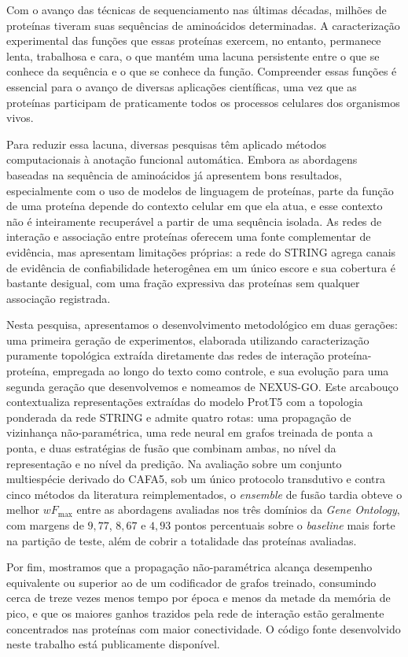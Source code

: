 \documentclass[Ingles]{ic-tese-v3}
\begin{document}
\begin{resumo}
Com o avanço das técnicas de sequenciamento nas últimas décadas, milhões de proteínas tiveram suas sequências de aminoácidos determinadas. A caracterização experimental das funções que essas proteínas exercem, no entanto, permanece lenta, trabalhosa e cara, o que mantém uma lacuna persistente entre o que se conhece da sequência e o que se conhece da função. Compreender essas funções é essencial para o avanço de diversas aplicações científicas, uma vez que as proteínas participam de praticamente todos os processos celulares dos organismos vivos.

Para reduzir essa lacuna, diversas pesquisas têm aplicado métodos computacionais à anotação funcional automática. Embora as abordagens baseadas na sequência de aminoácidos já apresentem bons resultados, especialmente com o uso de modelos de linguagem de proteínas, parte da função de uma proteína depende do contexto celular em que ela atua, e esse contexto não é inteiramente recuperável a partir de uma sequência isolada. As redes de interação e associação entre proteínas oferecem uma fonte complementar de evidência, mas apresentam limitações próprias: a rede do STRING agrega canais de evidência de confiabilidade heterogênea em um único escore e sua cobertura é bastante desigual, com uma fração expressiva das proteínas sem qualquer associação registrada.

Nesta pesquisa, apresentamos o desenvolvimento metodológico em duas gerações: uma primeira geração de experimentos, elaborada utilizando caracterização puramente topológica extraída diretamente das redes de interação proteína-proteína, empregada ao longo do texto como controle, e sua evolução para uma segunda geração que desenvolvemos e nomeamos de NEXUS-GO. Este arcabouço contextualiza representações extraídas do modelo ProtT5 com a topologia ponderada da rede STRING e admite quatro rotas: uma propagação de vizinhança não-paramétrica, uma rede neural em grafos treinada de ponta a ponta, e duas estratégias de fusão que combinam ambas, no nível da representação e no nível da predição. Na avaliação sobre um conjunto multiespécie derivado do CAFA5, sob um único protocolo transdutivo e contra cinco métodos da literatura reimplementados, o \emph{ensemble} de fusão tardia obteve o melhor $wF_{\max}$ entre as abordagens avaliadas nos três domínios da \emph{Gene Ontology}, com margens de $9{,}77$, $8{,}67$ e $4{,}93$ pontos percentuais sobre o \emph{baseline} mais forte na partição de teste, além de cobrir a totalidade das proteínas avaliadas.

Por fim, mostramos que a propagação não-paramétrica alcança desempenho equivalente ou superior ao de um codificador de grafos treinado, consumindo cerca de treze vezes menos tempo por época e menos da metade da memória de pico, e que os maiores ganhos trazidos pela rede de interação estão geralmente concentrados nas proteínas com maior conectividade. O código fonte desenvolvido neste trabalho está publicamente disponível.
\end{resumo}
\end{document}
